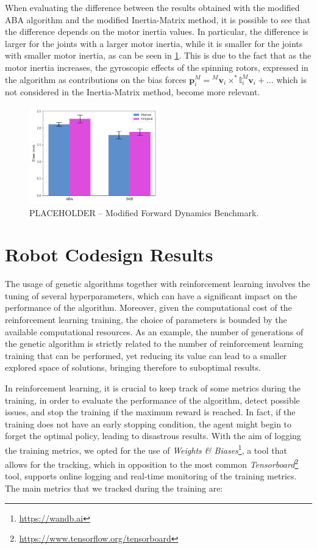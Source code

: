 When evaluating the difference between the results obtained with the modified \ac{ABA} algorithm and the modified Inertia-Matrix method, it is possible to see that the difference depends on the motor inertia values. In particular, the difference is larger for the joints with a larger motor inertia, while it is smaller for the joints with smaller motor inertia, as can be seen in \cref{fig:fd_comparison}. This is due to the fact that as the motor inertia increases, the gyroscopic effects of the spinning rotors,
expressed in the algorithm as contributions on the bias forces $\mathbf{p}^M _i = {}^M \mathbf{v}_i \times ^* \mathbb{I} _i ^M \mathbf{v}_i + \dots$ which is not considered in the Inertia-Matrix method, become more relevant.

\begin{figure}
    \centering
    \caption{PLACEHOLDER -- Modified Forward Dynamics Benchmark.}
    \label{fig:fd_comparison}
    \includegraphics[width=0.5\textwidth]{Images/Results/time_comparison_aba.png}
\end{figure}

\section{Robot Codesign Results}
\label{sec:codesign_results}

The usage of genetic algorithms together with reinforcement learning involves the tuning of several hyperparameters, which can have a significant impact on the performance of the algorithm. Moreover, given the computational cost of the reinforcement learning training, the choice of parameters is bounded by the available computational resources. As an example, the number of generations of the genetic algorithm is strictly related to the number of reinforcement learning training that can be performed, yet reducing its value can lead to a smaller explored space of solutions, bringing therefore to suboptimal results.

In reinforcement learning, it is crucial to keep track of some metrics during the training, in order to evaluate the performance of the algorithm, detect possible issues, and stop the training if the maximum reward is reached. In fact, if the training does not have an early stopping condition, the agent might begin to forget the optimal policy, leading to disastrous results. With the aim of logging the training metrics, we opted for the use of \textit{Weights {\&} Biases}\footnote{\url{https://wandb.ai}}, a tool that allows for the tracking, which in opposition to the most common \textit{Tensorboard}\footnote{\url{https://www.tensorflow.org/tensorboard}} tool, supports online logging and real-time monitoring of the training metrics. The main metrics that we tracked during the training are:

